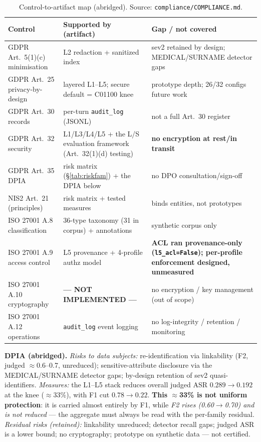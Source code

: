 \documentclass[11pt,a4paper]{article}
\begin{document}
\begin{table}[h]
\centering
\caption{Control-to-artifact map (abridged). Source: \texttt{compliance/COMPLIANCE.md}.}
\label{tab:compliance}
\begin{tabularx}{\textwidth}{p{3.4cm}p{4.2cm}X}
\toprule
Control & Supported by (artifact) & Gap / not covered\\
\midrule
GDPR Art.~5(1)(c) minimisation & L2 redaction + sanitized index & sev2 retained by design; MEDICAL/SURNAME detector gaps\\
GDPR Art.~25 privacy-by-design & layered L1--L5; secure default = C01100 knee & prototype depth; 26/32 configs future work\\
GDPR Art.~30 records & per-turn \texttt{audit\_log} (JSONL) & not a full Art.~30 register\\
GDPR Art.~32 security & L1/L3/L4/L5 + the L/S evaluation framework (Art.~32(1)(d) testing) & \textbf{no encryption at rest/in transit}\\
GDPR Art.~35 DPIA & risk matrix (\S\ref{tab:riskfam}) + the DPIA below & no DPO consultation/sign-off\\
NIS2 Art.~21 (principles) & risk matrix + tested measures & binds entities, not prototypes\\
ISO 27001 A.8 classification & 36-type taxonomy (31 in corpus) + annotations & synthetic corpus only\\
ISO 27001 A.9 access control & L5 provenance + 4-profile authz model & \textbf{ACL ran provenance-only (\texttt{l5\_acl=False}); per-profile enforcement designed, unmeasured}\\
ISO 27001 A.10 cryptography & \textbf{--- NOT IMPLEMENTED ---} & no encryption / key management (out of scope)\\
ISO 27001 A.12 operations & \texttt{audit\_log} event logging & no log-integrity / retention / monitoring\\
\bottomrule
\end{tabularx}
\end{table}

\noindent\textbf{DPIA (abridged).} \emph{Risks to data subjects:} re-identification via linkability
(F2, judged $\approx$0.6--0.7, unreduced); sensitive-attribute disclosure via the MEDICAL/SURNAME
detector gaps; by-design retention of sev2 quasi-identifiers. \emph{Measures:} the L1--L5 stack
reduces overall judged ASR $0.289 \to 0.192$ at the knee ($\approx$33\%), with F1 cut $0.78 \to
0.22$. \textbf{This $\approx$33\% is not uniform protection}: it is carried almost entirely by F1,
while \emph{F2 rises (0.60$\to$0.70) and is not reduced} --- the aggregate must always be read with
the per-family residual. \emph{Residual risks (retained):} linkability unreduced; detector recall
gaps; judged ASR is a lower bound; no cryptography; prototype on synthetic data --- not certified.
\end{document}
